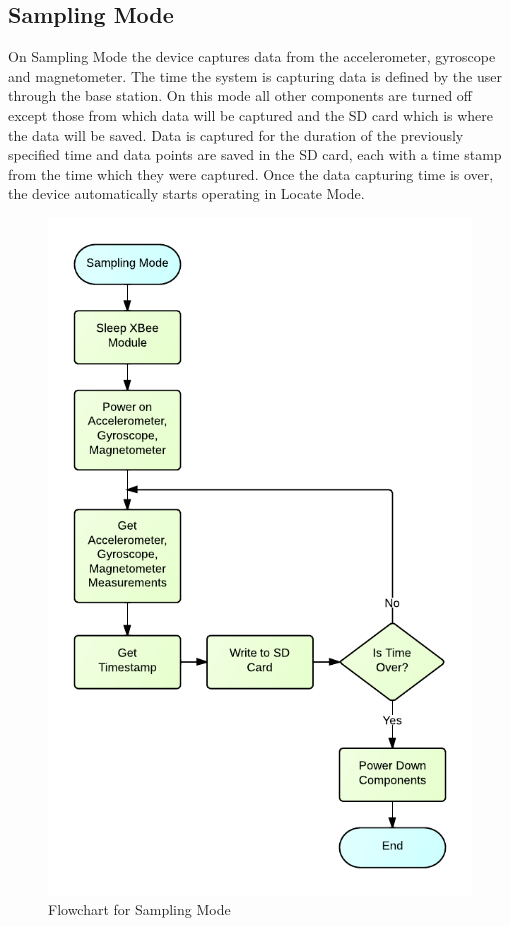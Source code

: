 \subsection{Sampling Mode}
On Sampling Mode the device captures data from the accelerometer, gyroscope and magnetometer. The time the system is capturing data is defined by the user through the base station. On this mode all other components are turned off except those from which data will be captured and the SD card which is where the data will be saved. Data is captured for the duration of the previously specified time and data points are saved in the SD card, each with a time stamp from the time which they were captured. Once the data capturing time is over, the device automatically starts operating in Locate Mode.
\begin{figure}[H]
	\centering
	\includegraphics[scale=0.9]{img/SamplingMode}
	\caption{Flowchart for Sampling Mode \label{fig:samplingMode}}
\end{figure}

